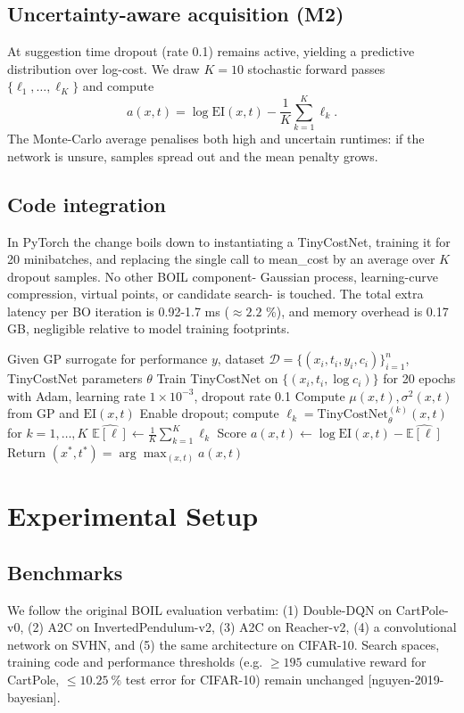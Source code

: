 \documentclass{article}
\begin{document}
\subsection{Uncertainty-aware acquisition (M2)}
At suggestion time dropout (rate 0.1) remains active, yielding a predictive distribution over log-cost. We draw $K=10$ stochastic forward passes $\{\ell_1,\ldots,\ell_K\}$ and compute
\[
 a(x,t)=\log \mathrm{EI}(x,t) - \frac{1}{K}\sum_{k=1}^K \ell_k.
\]
The Monte-Carlo average penalises both high and uncertain runtimes: if the network is unsure, samples spread out and the mean penalty grows.

\subsection{Code integration}
In PyTorch the change boils down to instantiating a TinyCostNet, training it for 20 minibatches, and replacing the single call to mean\_cost by an average over $K$ dropout samples. No other BOIL component- Gaussian process, learning-curve compression, virtual points, or candidate search- is touched. The total extra latency per BO iteration is 0.92-1.7 ms ($\approx 2.2$ \%), and memory overhead is 0.17 GB, negligible relative to model training footprints.

\begin{algorithm}
\caption{COCO-BOIL acquisition and suggestion step}
\begin{algorithmic}[1]
\State Given GP surrogate for performance $y$, dataset $\mathcal{D}=\{(x_i,t_i, y_i, c_i)\}_{i=1}^n$, TinyCostNet parameters $\theta$
\State Train TinyCostNet on $\{(x_i,t_i, \log c_i)\}$ for 20 epochs with Adam, learning rate $1\times 10^{-3}$, dropout rate 0.1
  \State Compute $\mu(x,t),\sigma^2(x,t)$ from GP and $\mathrm{EI}(x,t)$
  \State Enable dropout; compute $\ell_k=\text{TinyCostNet}_{\theta}^{(k)}(x,t)$ for $k=1,\ldots,K$
  \State $\widehat{\mathbb{E}[\ell]} \leftarrow \frac{1}{K}\sum_{k=1}^K \ell_k$
  \State Score $a(x,t) \leftarrow \log \mathrm{EI}(x,t) - \widehat{\mathbb{E}[\ell]}$
\EndFor
\State Return $(x^*,t^*)=\arg\max_{(x,t)} a(x,t)$
\end{algorithmic}
\end{algorithm}

\section{Experimental Setup}
\subsection{Benchmarks}
We follow the original BOIL evaluation verbatim: (1) Double-DQN on CartPole-v0, (2) A2C on InvertedPendulum-v2, (3) A2C on Reacher-v2, (4) a convolutional network on SVHN, and (5) the same architecture on CIFAR-10. Search spaces, training code and performance thresholds (e.g. $\ge 195$ cumulative reward for CartPole, $\le 10.25\ \%$ test error for CIFAR-10) remain unchanged [nguyen-2019-bayesian].
\end{document}

